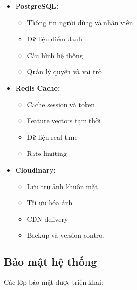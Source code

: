 \begin{itemize}
    \item \textbf{PostgreSQL:}
    \begin{itemize}
        \item Thông tin người dùng và nhân viên
        \item Dữ liệu điểm danh
        \item Cấu hình hệ thống
        \item Quản lý quyền và vai trò
    \end{itemize}
    
    \item \textbf{Redis Cache:}
    \begin{itemize}
        \item Cache session và token
        \item Feature vectors tạm thời
        \item Dữ liệu real-time
        \item Rate limiting
    \end{itemize}
    
    \item \textbf{Cloudinary:}
    \begin{itemize}
        \item Lưu trữ ảnh khuôn mặt
        \item Tối ưu hóa ảnh
        \item CDN delivery
        \item Backup và version control
    \end{itemize}
\end{itemize}

\subsection{Bảo mật hệ thống}
\hspace{0.5cm}Các lớp bảo mật được triển khai:

